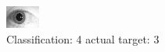 \begin{figure}[h!]
\begin{center}
\includegraphics[width=0.60\columnwidth]{figures/ID1817_class_4_target_3.png}
\end{center}
\caption{ Classification: 4 actual target: 3}
\label{fig:ID1817_class_4_target_3}
\end{figure}
